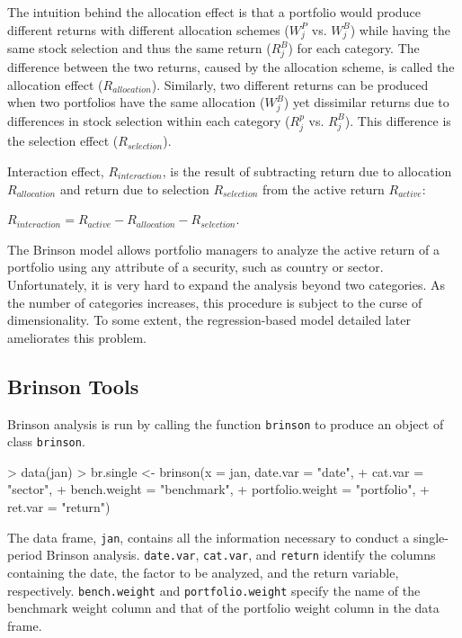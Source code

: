 The intuition behind the allocation effect is that a portfolio would
produce different returns with different allocation schemes ($W^P_j$
vs. $W^B_j$) while having the same stock selection and thus the same
return ($R^B_j$) for each category. The difference between the two
returns, caused by the allocation scheme, is called the allocation
effect ($R_{allocation}$). Similarly, two different returns can be
produced when two portfolios have the same allocation ($W^B_j$) yet
dissimilar returns due to differences in stock selection within each
category ($R^p_j$ vs. $R^B_j$). This difference is the selection
effect ($R_{selection}$).

Interaction effect, $R_{interaction}$, is the result of subtracting
return due to allocation $R_{allocation}$ and return due to selection
$R_{selection}$ from the active return $R_{active}$:
\begin{center}
  $R_{interaction} = R_{active} - R_{allocation} - R_{selection}$.
\end{center}

The Brinson model allows portfolio managers to analyze the active
return of a portfolio using any attribute of a security, such as
country or sector. Unfortunately, it is very hard to expand the analysis beyond 
two categories. As the number of
categories increases, this procedure is subject to the curse
  of dimensionality. To some extent, the regression-based model detailed later 
  ameliorates this problem.


\subsection{Brinson Tools}

Brinson analysis is run by calling the function \texttt{brinson} to
produce an object of class \texttt{brinson}. 

\begin{Schunk}
\begin{Sinput}
> data(jan)
> br.single <- brinson(x = jan, date.var = "date", 
+                  cat.var = "sector",
+                  bench.weight = "benchmark", 
+                  portfolio.weight = "portfolio", 
+                  ret.var = "return")
\end{Sinput}
\end{Schunk}

The data frame, \texttt{jan}, contains all the information necessary
to conduct a single-period Brinson analysis. \texttt{date.var},
\texttt{cat.var}, and \texttt{return} identify the columns containing
the date, the factor to be analyzed, and the return variable,
respectively. \texttt{bench.weight} and \texttt{portfolio.weight}
specify the name of the benchmark weight column and that of the
portfolio weight column in the data frame.

